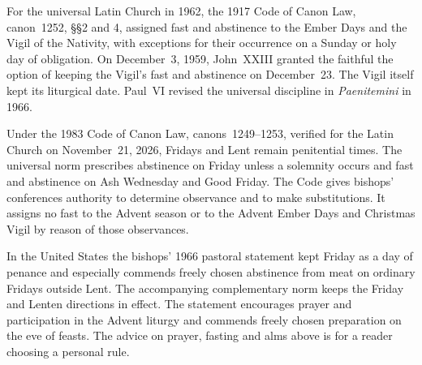 For the universal Latin Church in 1962, the 1917 Code of Canon Law,
canon~1252, \S\S2 and 4, assigned fast and abstinence to the Ember Days and
the Vigil of the Nativity, with exceptions for their occurrence on a
Sunday or holy day of obligation. On December~3, 1959, John~XXIII
granted the faithful the option of keeping the Vigil's fast and abstinence
on December~23. The Vigil itself kept its liturgical date. Paul~VI
revised the universal discipline in
\textit{Paenitemini} in 1966.

Under the 1983 Code of Canon Law, canons~1249--1253, verified for the Latin
Church on November~21, 2026, Fridays and Lent remain penitential times. The
universal norm prescribes abstinence on Friday unless a solemnity occurs
and fast and abstinence on Ash Wednesday and Good Friday. The Code gives
bishops' conferences authority to determine observance and to make
substitutions. It assigns no fast to the Advent season or to the Advent
Ember Days and Christmas Vigil by reason of those observances.

In the United States the bishops' 1966 pastoral statement kept Friday as a
day of penance and especially commends freely chosen abstinence from meat on
ordinary Fridays outside Lent. The accompanying
complementary norm keeps the Friday and Lenten directions in effect.
The statement encourages prayer and participation in the Advent liturgy
and commends freely chosen preparation on the eve of feasts. The advice
on prayer, fasting and alms above is for a reader choosing a personal rule.

